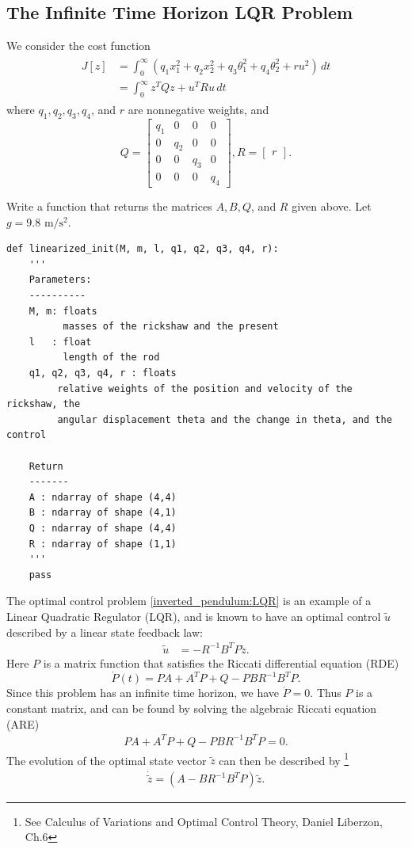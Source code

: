 \subsection*{The Infinite Time Horizon LQR Problem}
We consider the cost function
\begin{align}
\begin{split}
J[z] &= \int_0^{\infty} (q_1x_1^2 + q_2x_2^2  + q_3\theta_1^2 + q_4\theta_2^2 + ru^2)\, dt\\
&= \int_0^{\infty} z^TQz + u^TRu \, dt
\end{split} \label{inverted_pendulum:LQR}
\end{align}
where $q_1, q_2, q_3, q_4$, and $r$ are nonnegative weights, and 
\[
Q = 
\begin{bmatrix}
q_1 & 0 & 0 & 0 \\
0 & q_2 & 0 & 0\\
0 & 0 & q_3 & 0 \\
0 & 0 & 0 & q_4
\end{bmatrix}, R = \begin{bmatrix} r \end{bmatrix}.
\]

\begin{problem}
Write a function that returns the matrices $A, B, Q$, and $R$ given above. Let $g = 9.8\text{ m}/\text{s}^2$.	
	
\begin{lstlisting}
def linearized_init(M, m, l, q1, q2, q3, q4, r): 
	'''
	Parameters:
	----------
	M, m: floats
          masses of the rickshaw and the present
	l 	: float
          length of the rod
	q1, q2, q3, q4, r : floats
         relative weights of the position and velocity of the rickshaw, the 
		 angular displacement theta and the change in theta, and the control
	
	Return
	-------
	A : ndarray of shape (4,4) 
	B : ndarray of shape (4,1) 
	Q : ndarray of shape (4,4) 
	R : ndarray of shape (1,1) 
	'''
	pass	
\end{lstlisting}
\end{problem}

The optimal control problem \eqref{inverted_pendulum:LQR} is an example of a Linear Quadratic Regulator (LQR), and is known to have an optimal control $\tilde{u}$ described by a linear state feedback law:
\begin{align*}
\tilde{u} &= -R^{-1}B^TP\tilde{z}.
\end{align*}
Here $P$ is a matrix function that satisfies the Riccati differential equation (RDE)
\[
\dot{P}(t) = PA + A^TP + Q - PBR^{-1}B^T P.  
\]
Since this problem has an infinite time horizon, we have $\dot{P} = 0$. Thus $P$ is a constant matrix, and can be found by solving the algebraic Riccati equation (ARE)
\begin{align}
 PA + A^TP + Q - PBR^{-1}B^T P = 0.  \label{inverted_pendulum:ARE}
\end{align}
The evolution of the optimal state vector $\tilde{z}$ can then be described by \footnote{See Calculus of Variations and Optimal Control Theory, Daniel Liberzon, Ch.6}
\begin{align}
\dot{\tilde{z}} = (A - BR^{-1}B^TP)\tilde{z}. \label{inverted_pendulum:optimal_state}
\end{align}


